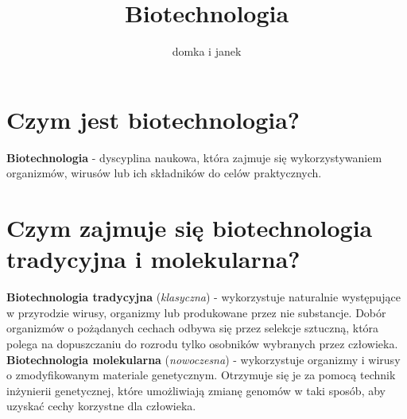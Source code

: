 \documentclass[a4paper, twocolumn]{article}
\title{Biotechnologia}
\author{domka i janek}
\begin{document}
\maketitle
\section{Czym jest biotechnologia?}%
\label{sec:Czym jest biotechnologia?}
\textbf{Biotechnologia} - dyscyplina naukowa, która zajmuje się wykorzystywaniem organizmów, wirusów lub ich składników do celów praktycznych.
\section{Czym zajmuje się biotechnologia tradycyjna i molekularna?}%
\label{sec:Czym zajmuje się biotechnologia tradycyjna i molekularna?}
\textbf{Biotechnologia tradycyjna} (\textit{klasyczna}) - wykorzystuje naturalnie występujące w przyrodzie wirusy, organizmy lub produkowane przez nie substancje.
Dobór organizmów o pożądanych cechach odbywa się przez selekcje sztuczną, która polega na dopuszczaniu do rozrodu tylko osobników wybranych przez człowieka.
\\
\textbf{Biotechnologia molekularna} (\textit{nowoczesna}) - wykorzystuje organizmy i wirusy o zmodyfikowanym materiale genetycznym. 
Otrzymuje się je za pomocą technik inżynierii genetycznej, które umożliwiają zmianę genomów w taki sposób, aby uzyskać cechy korzystne dla człowieka.
\end{document}
